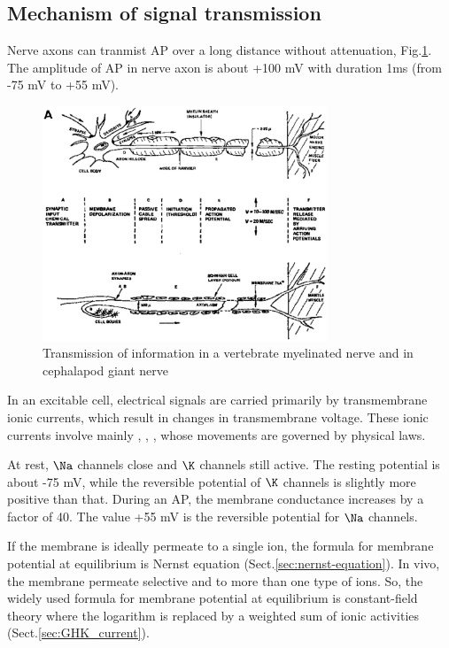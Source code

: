 \subsection{Mechanism of signal transmission}
\label{sec:neuron_mechanism_transmission}

Nerve axons can tranmist AP over a long distance without attenuation,
Fig.\ref{fig:nerve_cell}.
The amplitude of AP in nerve axon is about +100 mV with duration 1ms (from -75
mV to +55 mV).


\begin{figure}[hbt]
  \centerline{\includegraphics[height=7cm]{./images/nerve_cell.eps}}
  \caption{Transmission of information in a vertebrate myelinated nerve and in
  cephalapod giant nerve \citep{ehrenstein1972}}
  \label{fig:nerve_cell}
\end{figure}

In an excitable cell, electrical signals are carried primarily by
transmembrane ionic currents, which result in changes in transmembrane
voltage. These ionic currents involve mainly , ,
,  whose movements are governed by physical laws.

At rest, $\Na$ channels close and $\K$ channels still active. The resting
potential is about -75 mV, while the reversible potential of $\K$ channels
is slightly more positive than that. During an AP, the membrane conductance
increases by a factor of 40. The value +55 mV is the reversible potential for
$\Na$ channels. 

If the membrane is ideally permeate to a single ion, the formula for membrane
potential at equilibrium is Nernst equation (Sect.\ref{sec:nernst-equation}). In
vivo, the membrane permeate selective and to more than one type of ions. So, the
widely used formula for membrane potential at equilibrium is constant-field
theory where the logarithm is replaced by a weighted sum of ionic activities
(Sect.\ref{sec:GHK_current}).

